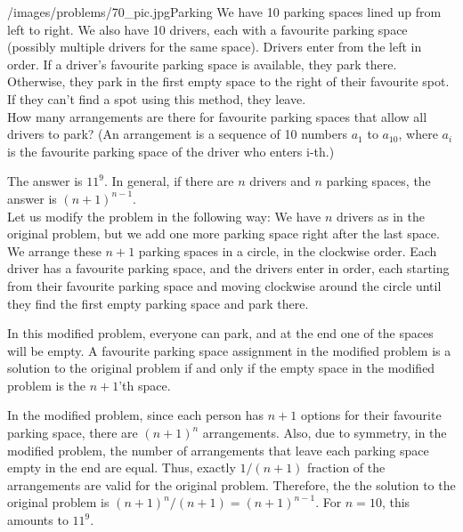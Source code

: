 \begin{problem}{/images/problems/70_pic.jpg}{Parking} We have 10 parking spaces lined up from left to right. We also have 10 drivers, each with a favourite parking space (possibly multiple drivers for the same space). Drivers enter from the left in order. If a driver's favourite parking space is available, they park there. Otherwise, they park in the first empty space to the right of their favourite spot. If they can't find a spot using this method, they leave.\\[0.2cm]
	
How many arrangements are there for favourite parking spaces that allow all drivers to park? (An arrangement is a sequence of 10 numbers $a_1$ to $a_{10}$, where $a_i$ is the favourite parking space of the driver who enters i-th.)
\end{problem}

\begin{solution}
The answer is $11^9$. In general, if there are $n$ drivers and $n$ parking spaces, the answer is $(n+1)^{n-1}$.\\[0.2cm]

Let us modify the problem in the following way: We have $n$ drivers as in the original problem, but we add one more parking space right after the last space. We arrange these $n+1$ parking spaces in a circle, in the clockwise order. Each driver has a favourite parking space, and the drivers enter in order, each starting from their favourite parking space and moving clockwise around the circle until they find the first empty parking space and park there.

In this modified problem, everyone can park, and at the end one of the spaces will be empty. A favourite parking space assignment in the modified problem is a solution to the original problem if and only if the empty space in the modified problem is the $n+1$'th space.

In the modified problem, since each person has $n+1$ options for their favourite parking space, there are $(n+1)^n$ arrangements. Also, due to symmetry, in the modified problem, the number of arrangements that leave each parking space empty in the end are equal. Thus, exactly $1/(n+1)$ fraction of the arrangements are valid for the original problem. Therefore, the the solution to the original problem is  $(n+1)^n/(n+1) = (n+1)^{n-1}$. For $n=10$, this amounts to $11^9$.
\end{solution}

